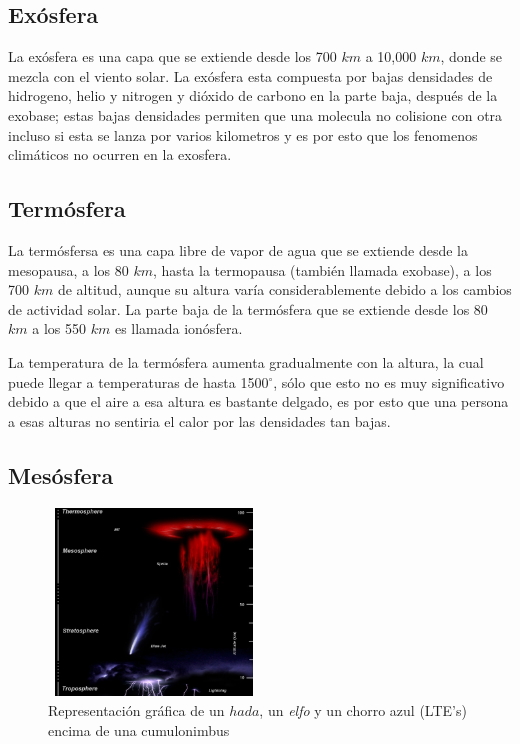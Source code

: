 \documentclass{article} %
\begin{document}
\subsection{Exósfera}

La exósfera es una capa que se extiende desde los 700 $km$ a 10,000 $km$, donde se mezcla con el viento solar. La exósfera esta compuesta por bajas densidades de hidrogeno, helio y nitrogen y dióxido de carbono en la parte baja, después de la exobase; estas bajas densidades permiten que una molecula no colisione con otra incluso si esta se lanza por varios kilometros y es por esto que los fenomenos climáticos no ocurren en la exosfera.

\subsection{Termósfera}
	
La termósfersa es una capa libre de vapor de agua que se extiende desde la mesopausa, a los 80 $km$, hasta la termopausa (también llamada exobase), a los 700 $km$ de altitud, aunque su altura varía considerablemente debido a los cambios de actividad solar. La parte baja de la termósfera que se extiende desde los 80 $km$ a los 550 $km$ es llamada ionósfera.

La temperatura de la termósfera aumenta gradualmente con la altura, la cual puede llegar a temperaturas de hasta 1500$^{\circ}$, sólo que esto no es muy significativo debido a que el aire a esa altura es bastante delgado, es por esto que una persona a esas alturas no sentiria el calor por las densidades tan bajas.

\subsection{Mesósfera}

\begin{figure}
    \includegraphics[height=5cm,width=0.50\textwidth]{Upperatmoslight1.jpg}
	\caption{Representación gráfica de un $hada$, un \textit{elfo} y un chorro azul (LTE's) encima de una cumulonimbus}
\end{figure}
\end{document}
